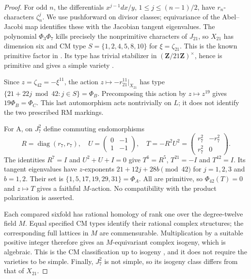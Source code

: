 \begin{proof}
For odd $n$, the differentials $x^{j-1}dx/y$, $1\leq j\leq(n-1)/2$,
have $r_n$-characters $\zeta_n^j$. We use pushforward on divisor classes;
equivariance of the Abel--Jacobi map identifies these with the Jacobian
tangent eigenvalues. The polynomial $\Phi_3\Phi_7$ kills precisely the
nonprimitive characters of $J_{21}$, so $X_{21}$ has dimension six and
CM type $S=\{1,2,4,5,8,10\}$ for $\xi=\zeta_{21}$.
This is the known primitive factor in
\cite[Eq.~(4.2), Lem.~4.2, Prop.~4.1 and Sec.~5.3]{Goodson2024}.
Its type has trivial stabilizer in $(\mathbf Z/21\mathbf Z)^\times$,
hence is primitive and gives a simple variety
\cite[Prop.~3.13]{MilneCM2020}.

Since $z=\zeta_{42}=-\xi^{11}$, the action
$z\mapsto-r_{21}^{11}|_{X_{21}}$ has type
$\{21+22j\bmod42:j\in S\}=\Phi_B$.
Precomposing this action by $z\mapsto z^{19}$ gives
$19\Phi_B=\Phi_C$. This last automorphism acts nontrivially on $L$;
it does not identify the two prescribed RM markings.

For A, on $J_7^2$ define commuting endomorphisms
\[
 R=\operatorname{diag}(r_7,r_7),\quad
 U=\begin{pmatrix}0&-1\\1&-1\end{pmatrix},\quad
 T=-R^2U^2=\begin{pmatrix}r_7^2&-r_7^2\\r_7^2&0\end{pmatrix}.
\]
The identities $R^7=I$ and $U^2+U+I=0$ give
$T^6=R^5$, $T^{21}=-I$ and $T^{42}=I$.
Its tangent eigenvalues have $z$-exponents
$21+12j+28b\pmod{42}$ for $j=1,2,3$ and $b=1,2$.
Their set is $\{1,5,17,19,29,31\}=\Phi_A$.
All are primitive, so $\Phi_{42}(T)=0$ and $z\mapsto T$ gives
a faithful $M$-action. No compatibility with the product polarization is
asserted.

Each compared sixfold has rational homology of rank one over the
degree-twelve field $M$. Equal specified CM types identify their rational
complex structures; the corresponding full lattices in $M$ are
commensurable. Multiplication by a suitable positive integer therefore
gives an $M$-equivariant complex isogeny, which is algebraic. This is the
CM classification up to isogeny \cite[Prop.~3.12]{MilneCM2020}, and it
does not require the varieties to be simple. Finally, $J_7^2$ is not
simple, so its isogeny class differs from that of $X_{21}$.
\end{proof}


